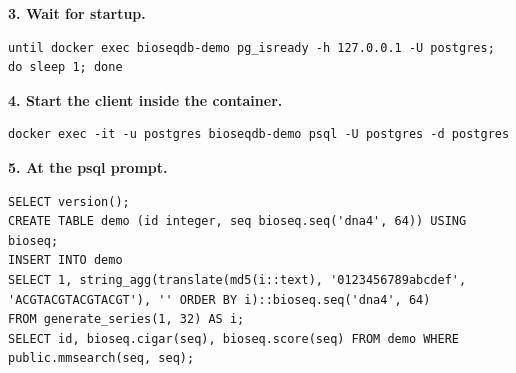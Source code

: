 \noindent\textbf{3. Wait for startup.}
\begin{lstlisting}[style=resource-shell]
until docker exec bioseqdb-demo pg_isready -h 127.0.0.1 -U postgres; do sleep 1; done
\end{lstlisting}

\noindent\textbf{4. Start the client inside the container.}
\begin{lstlisting}[style=resource-shell]
docker exec -it -u postgres bioseqdb-demo psql -U postgres -d postgres
\end{lstlisting}

\noindent\textbf{5. At the psql prompt.}
\begin{lstlisting}[style=resource-sql]
SELECT version();
CREATE TABLE demo (id integer, seq bioseq.seq('dna4', 64)) USING bioseq;
INSERT INTO demo
SELECT 1, string_agg(translate(md5(i::text), '0123456789abcdef', 'ACGTACGTACGTACGT'), '' ORDER BY i)::bioseq.seq('dna4', 64)
FROM generate_series(1, 32) AS i;
SELECT id, bioseq.cigar(seq), bioseq.score(seq) FROM demo WHERE public.mmsearch(seq, seq);
\end{lstlisting}

\endgroup

